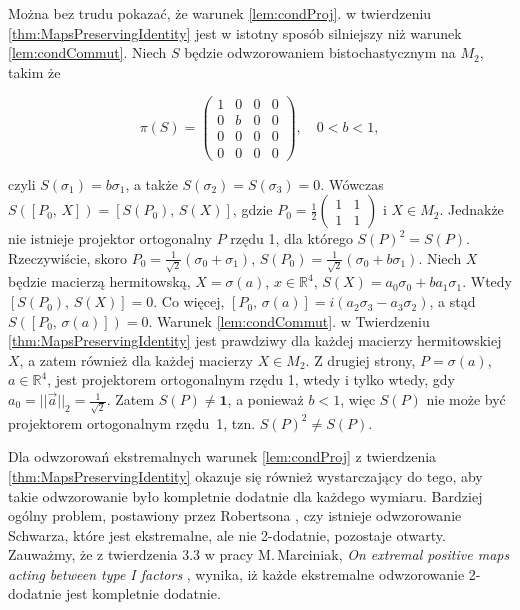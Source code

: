 \begin{Example}
Można bez trudu pokazać, że warunek \ref{lem:condProj}. w
twierdzeniu \ref{thm:MapsPreservingIdentity} jest w istotny sposób silniejszy
niż warunek \ref{lem:condCommut}.
Niech $S$ będzie odwzorowaniem bistochastycznym na $M_{2}$, takim że
\begin{linenomath*}
 \begin{equation}
\label{RandomLabel:514431}
    \pi(S) = \begin{pmatrix}
    1 & 0 & 0 & 0 \\
    0 & b & 0 & 0 \\
    0 & 0 & 0 & 0 \\
    0 & 0 & 0 & 0
    \end{pmatrix},
    \quad 0 < b < 1,
 \end{equation}
\end{linenomath*}
czyli $S(\sigma_{1}) = b \sigma_{1}$, a także
$S(\sigma_{2}) = S(\sigma_{3}) = 0$.
Wówczas $S\left( [P_{0}, \, X ] \right) = [ S(P_{0}), \, S(X) ]$,
gdzie
$P_{0}= \frac{1}{2} \left( \begin{smallmatrix}
 1 & 1 \\ 1 & 1
 \end{smallmatrix} \right)$ i $X \in M_{2}$.
Jednakże nie istnieje projektor ortogonalny $P$ rzędu 1,
dla którego $S(P)^{2} = S(P)$.
Rzeczywiście, skoro
$P_{0} = \frac{1}{\sqrt{2}}(\sigma_{0} + \sigma_{1})$,
$S(P_{0}) = \frac{1}{\sqrt{2}}(\sigma_{0} + b \sigma_{1})$.
Niech $X$ będzie macierzą hermitowską, $X = \sigma(a)$, $x \in \mathbb{R}^{4}$,
$S(X) = a_{0} \sigma_{0} + b a_{1} \sigma_{1}$.
Wtedy $[S(P_{0}), \, S(X) ] =0$.
Co więcej,
$[P_{0}, \, \sigma(a)] =
i(a_{2} \sigma_{3} - a_{3} \sigma_{2})$,
a stąd
$S([P_{0}, \, \sigma(a)]) = 0$.
Warunek \ref{lem:condCommut}. w Twierdzeniu \ref{thm:MapsPreservingIdentity}
jest prawdziwy dla każdej macierzy hermitowskiej $X$,
a zatem również dla każdej macierzy $X \in M_{2}$.
Z drugiej strony,
$P = \sigma(a)$, $a \in \mathbb{R}^{4}$, jest projektorem ortogonalnym
rzędu 1,
wtedy i tylko wtedy, gdy $a_{0} = ||\vec{a}||_{2} = \frac{1}{\sqrt{2}}$.
Zatem $S(P) \neq \mathbf{1}$, a ponieważ $b<1$,
więc $S(P)$ nie może być projektorem ortogonalnym \mbox{rzędu 1},
tzn. $S(P)^{2} \neq S(P)$.
\end{Example}

Dla odwzorowań ekstremalnych warunek \ref{lem:condProj} z
twierdzenia \ref{thm:MapsPreservingIdentity} okazuje się również wystarczający
do tego, aby takie odwzorowanie było kompletnie dodatnie dla każdego wymiaru.
Bardziej ogólny problem, postawiony przez Robertsona
\cite{robertson1983schwarz},
czy istnieje odwzorowanie Schwarza, które jest ekstremalne, ale
nie 2-dodatnie, pozostaje otwarty.
Zauważmy, że z twierdzenia 3.3 w pracy
M.\,Marciniak, \emph{On extremal positive maps acting between type I factors}
\cite{marciniak2008extremal}, wynika, iż
każde ekstremalne odwzorowanie 2-dodatnie jest kompletnie dodatnie.

